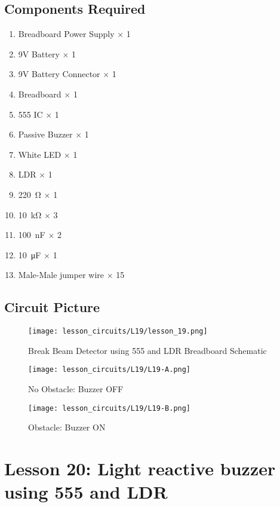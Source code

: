 \subsection{Components Required}
\begin{enumerate}
    \item Breadboard Power Supply $\times$ 1
    \item 9V Battery $\times$ 1
    \item 9V Battery Connector $\times$ 1
    \item Breadboard $\times$ 1
    \item 555 IC $\times$ 1
    \item Passive Buzzer $\times$ 1
    \item White LED $\times$ 1
    \item LDR $\times$ 1
    \item \SI{220}{\ohm} $\times$ 1
    \item \SI{10}{\kilo\ohm} $\times$ 3
    \item \SI{100}{\nano\farad} $\times$ 2
    \item \SI{10}{\micro\farad} $\times$ 1
    \item Male-Male jumper wire $\times$ 15
\end{enumerate}
\subsection{Circuit Picture}
\begin{figure}[!h]
    \centering
    \texttt{[image: lesson\_circuits/L19/lesson\_19.png]}
    \caption{Break Beam Detector using 555 and LDR Breadboard Schematic}
    \label{fig:555_bbdet_sch}
\end{figure}
\begin{figure}[!h]
    \centering
    \texttt{[image: lesson\_circuits/L19/L19-A.png]}
    \caption{No Obstacle: Buzzer OFF}
    \label{fig:555_bbdet_obb}
\end{figure}
\begin{figure}[!h]
    \centering
    \texttt{[image: lesson\_circuits/L19/L19-B.png]}
    \caption{Obstacle: Buzzer ON}
    \label{fig:555_bbdet_obb1}
\end{figure}
\section{Lesson 20: Light reactive buzzer using 555 and LDR}
